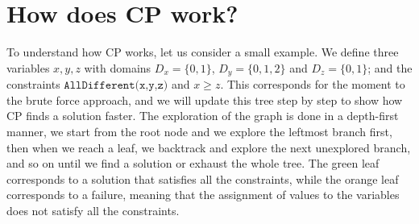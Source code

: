 \documentclass[12pt, openany]{report}
\theoremstyle{definition}
\begin{document}
\section{How does CP work?}
To understand how CP works, let us consider a small example. We define three variables $x,y,z$ with domains $D_x = \{0,1\}$, $D_y = \{0,1,2\}$ and $D_z = \{0,1\}$; and the constraints $\texttt{AllDifferent(x,y,z)}$ and $x \geq z$. This corresponds for the moment to the brute force approach, and we will update this tree step by step to show how CP finds a solution faster. The exploration of the graph is done in a depth-first manner, we start from the root node and we explore the leftmost branch first, then when we reach a leaf, we backtrack and explore the next unexplored branch, and so on until we find a solution or exhaust the whole tree. The green leaf corresponds to a solution that satisfies all the constraints, while the orange leaf corresponds to a failure, meaning that the assignment of values to the variables does not satisfy all the constraints.
\end{document}
